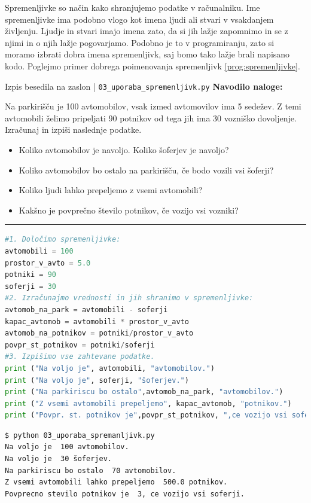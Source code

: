 Spremenljivke so način kako shranjujemo podatke v računalniku.  Ime
spremenljivke ima podobno vlogo kot imena ljudi ali stvari v
vsakdanjem življenju. Ljudje in stvari imajo imena zato, da si jih
lažje zapomnimo in se z njimi in o njih lažje pogovarjamo. Podobno je
to v programiranju, zato si moramo izbrati dobra imena spremenljivk,
saj bomo tako lažje brali napisano kodo. Poglejmo primer dobrega
poimenovanja spremenljivk \ref{prog:spremenljivke}.

\begin{examplebox}[label={prog:spremenljivke}]{Izpis besedila na
    zaslon | \texttt{03\_uporaba\_spremenljivk.py} \cite{web:PTHardWay}}
\textbf{Navodilo naloge:}

Na parkirišču je 100 avtomobilov, vsak izmed avtomovilov ima 5
sedežev. Z temi avtomobili želimo pripeljati 90 potnikov od tega jih
ima 30 vozniško dovoljenje. Izračunaj in izpiši naslednje podatke.
\begin{itemize}
\item Koliko avtomobilov je navoljo.  Koliko šoferjev je navoljo?
\item Koliko avtomobilov bo ostalo na parkirišču, če bodo vozili vsi
  šoferji?
\item Koliko ljudi lahko prepeljemo z vsemi avtomobili?
\item Kakšno je povprečno število potnikov, če vozijo vsi vozniki?
\end{itemize}
\rule{\textwidth}{.4pt}
\begin{lstlisting}[language=Python]
#1. Določimo spremenljivke:
avtomobili = 100
prostor_v_avto = 5.0
potniki = 90
soferji = 30
#2. Izračunajmo vrednosti in jih shranimo v spremenljivke:
avtomob_na_park = avtomobili - soferji
kapac_avtomob = avtomobili * prostor_v_avto
avtomob_na_potnikov = potniki/prostor_v_avto
povpr_st_potnikov = potniki/soferji
#3. Izpišimo vse zahtevane podatke.
print ("Na voljo je", avtomobili, "avtomobilov.")
print ("Na voljo je", soferji, "šoferjev.")
print ("Na parkiriscu bo ostalo",avtomob_na_park, "avtomobilov.")
print ("Z vsemi avtomobili prepeljemo", kapac_avtomob, "potnikov.")
print ("Povpr. st. potnikov je",povpr_st_potnikov, ",ce vozijo vsi soferji.")
\end{lstlisting}
\tcblower
\begin{Verbatim}[fontsize=\footnotesize]
$ python 03_uporaba_spremanljivk.py
Na voljo je  100 avtomobilov.
Na voljo je  30 šoferjev.
Na parkiriscu bo ostalo  70 avtomobilov.
Z vsemi avtomobili lahko prepeljemo  500.0 potnikov.
Povprecno stevilo potnikov je  3, ce vozijo vsi soferji.
\end{Verbatim}
\end{examplebox}

